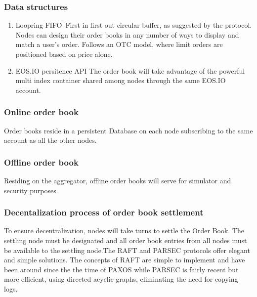 \documentclass[]{article}
\begin{document}
\subsubsection{Data structures}
\begin{enumerate}
\item Loopring FIFO\
	First in first out circular buffer, as suggested by the protocol. Nodes can design their order books in any number of ways to display and match a user's order. Follows an OTC model, where limit orders are positioned based on price alone.
	\cite{7}  
\item EOS.IO persitence API
	The order book will take advantage of the powerful multi index container shared among nodes through the same EOS.IO account.
\end{enumerate}

\subsubsection{Online order book}
Order books reside in a persistent Database on each node subscribing to the same account as all the other nodes.
\subsubsection{Offline order book}
Residing on the aggregator, offline order books will serve for simulator and security purposes.



\subsubsection{Decentalization process of order book settlement}
To ensure decentralization, nodes will take turns to settle the Order Book. The settling node must be designated and all order book entries from all nodes must be available to the settling node.The RAFT\cite{18} and PARSEC\cite{23} protocols
offer elegant and simple solutions. The concepts of RAFT are simple to implement and have been around since the the time of PAXOS\cite{24} while PARSEC is fairly recent but more efficient, using directed acyclic graphs, eliminating the need for copying logs.
\end{document}
